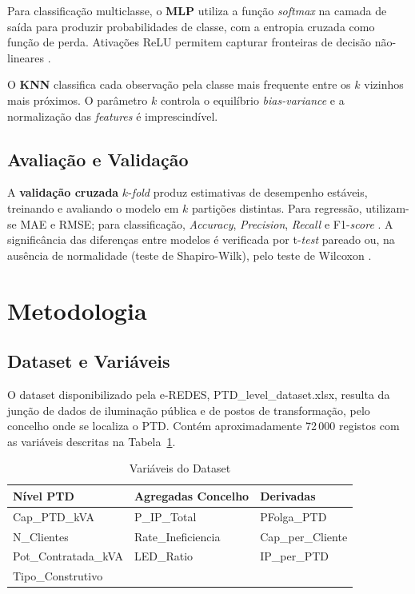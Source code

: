 \documentclass[conference]{IEEEtran}
\begin{document}
Para classificação multiclasse, o \textbf{MLP} utiliza a função \textit{softmax} na camada de saída para produzir probabilidades de classe, com a entropia cruzada como função de perda. Ativações ReLU permitem capturar fronteiras de decisão não-lineares \cite{goodfellow2016}.

O \textbf{KNN} \cite{cover1967} classifica cada observação pela classe mais frequente entre os $k$ vizinhos mais próximos. O parâmetro $k$ controla o equilíbrio \textit{bias-variance} e a normalização das \textit{features} é imprescindível.

\subsection{Avaliação e Validação}

A \textbf{validação cruzada} $k$-\textit{fold} \cite{kohavi1995} produz estimativas de desempenho estáveis, treinando e avaliando o modelo em $k$ partições distintas. Para regressão, utilizam-se MAE e RMSE; para classificação, \textit{Accuracy}, \textit{Precision}, \textit{Recall} e F1-\textit{score} \cite{bishop2006}. A significância das diferenças entre modelos é verificada por t-\textit{test} pareado ou, na ausência de normalidade (teste de Shapiro-Wilk), pelo teste de Wilcoxon \cite{mitchell1997}.

\section{Metodologia}

\subsection{Dataset e Variáveis}

O dataset disponibilizado pela e-REDES, PTD\_level\_dataset.xlsx, resulta da junção de dados de iluminação pública e de postos de transformação, pelo concelho onde se localiza o PTD. Contém aproximadamente 72\,000 registos com as variáveis descritas na Tabela~\ref{tab:variaveis}.

\begin{table}[H]
\caption{Variáveis do Dataset}
\label{tab:variaveis}
\begin{center}
\begin{tabular}{lll}
\toprule
Nível PTD & Agregadas Concelho & Derivadas \\
\midrule
Cap\_PTD\_kVA & P\_IP\_Total & PFolga\_PTD \\
N\_Clientes & Rate\_Ineficiencia & Cap\_per\_Cliente \\
Pot\_Contratada\_kVA & LED\_Ratio & IP\_per\_PTD \\
Tipo\_Construtivo & & \\
\bottomrule
\end{tabular}
\end{center}
\end{table}
\end{document}
